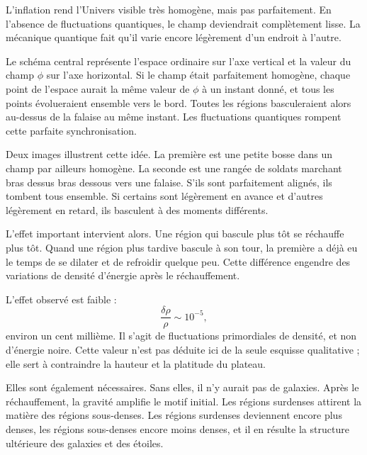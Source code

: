 L’inflation rend l’Univers visible très homogène, mais pas parfaitement. En l’absence de fluctuations quantiques, le champ deviendrait complètement lisse. La mécanique quantique fait qu’il varie encore légèrement d’un endroit à l’autre.

Le schéma central représente l’espace ordinaire sur l’axe vertical et la valeur du champ \(\phi\) sur l’axe horizontal. Si le champ était parfaitement homogène, chaque point de l’espace aurait la même valeur de \(\phi\) à un instant donné, et tous les points évolueraient ensemble vers le bord. Toutes les régions basculeraient alors au-dessus de la falaise au même instant. Les fluctuations quantiques rompent cette parfaite synchronisation.

Deux images illustrent cette idée. La première est une petite bosse dans un champ par ailleurs homogène. La seconde est une rangée de soldats marchant bras dessus bras dessous vers une falaise. S’ils sont parfaitement alignés, ils tombent tous ensemble. Si certains sont légèrement en avance et d’autres légèrement en retard, ils basculent à des moments différents.

L’effet important intervient alors. Une région qui bascule plus tôt se réchauffe plus tôt. Quand une région plus tardive bascule à son tour, la première a déjà eu le temps de se dilater et de refroidir quelque peu. Cette différence engendre des variations de densité d’énergie après le réchauffement.

\begin{classroomqa}
\end{classroomqa}

L’effet observé est faible :
\begin{equation}
\frac{\delta\rho}{\rho}\sim 10^{-5},
\end{equation}
environ un cent millième. Il s’agit de fluctuations primordiales de densité, et non d’énergie noire. Cette valeur n’est pas déduite ici de la seule esquisse qualitative ; elle sert à contraindre la hauteur et la platitude du plateau.

Elles sont également nécessaires. Sans elles, il n’y aurait pas de galaxies. Après le réchauffement, la gravité amplifie le motif initial. Les régions surdenses attirent la matière des régions sous-denses. Les régions surdenses deviennent encore plus denses, les régions sous-denses encore moins denses, et il en résulte la structure ultérieure des galaxies et des étoiles.

